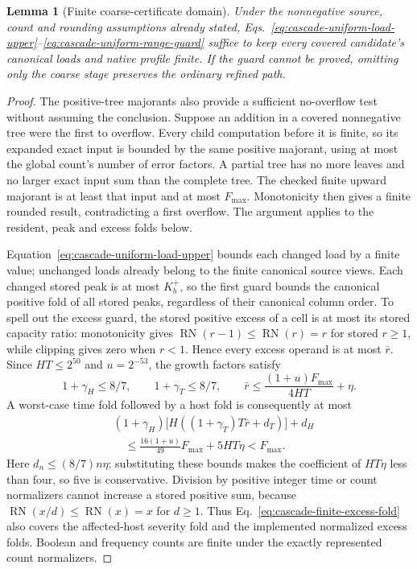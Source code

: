 \documentclass[11pt]{article}
\newtheorem{lemma}{Lemma}
\begin{document}
\begin{lemma}[Finite coarse-certificate domain]\label{lem:cascade-finite-domain}
Under the nonnegative source, count and rounding assumptions already stated, Eqs.~\eqref{eq:cascade-uniform-load-upper}--\eqref{eq:cascade-uniform-range-guard} suffice to keep every covered candidate's canonical loads and native profile finite. If the guard cannot be proved, omitting only the coarse stage preserves the ordinary refined path.
\end{lemma}
\begin{proof}
The positive-tree majorants also provide a sufficient no-overflow test without assuming the conclusion. Suppose an addition in a covered nonnegative tree were the first to overflow. Every child computation before it is finite, so its expanded exact input is bounded by the same positive majorant, using at most the global count's number of error factors. A partial tree has no more leaves and no larger exact input sum than the complete tree. The checked finite upward majorant is at least that input and at most $F_{\max}$. Monotonicity then gives a finite rounded result, contradicting a first overflow. The argument applies to the resident, peak and excess folds below.

Equation~\eqref{eq:cascade-uniform-load-upper} bounds each changed load by a finite value; unchanged loads already belong to the finite canonical source views. Each changed stored peak is at most $K_b^+$, so the first guard bounds the canonical positive fold of all stored peaks, regardless of their canonical column order. To spell out the excess guard, the stored positive excess of a cell is at most its stored capacity ratio: monotonicity gives $\operatorname{RN}(r-1)\le\operatorname{RN}(r)=r$ for stored $r\ge1$, while clipping gives zero when $r<1$. Hence every excess operand is at most $\bar r$. Since $HT\le2^{50}$ and $u=2^{-53}$, the growth factors satisfy
\begin{equation}
1+\gamma_H\le8/7,\qquad 1+\gamma_T\le8/7,
\qquad \bar r\le\frac{(1+u)F_{\max}}{4HT}+\eta.
\end{equation}
A worst-case time fold followed by a host fold is consequently at most
\begin{align}
&(1+\gamma_H)\bigl[H((1+\gamma_T)T\bar r+d_T)\bigr]+d_H\nonumber\\
&\quad\le\frac{16(1+u)}{49}F_{\max}+5HT\eta<F_{\max}.
\label{eq:cascade-finite-excess-fold}
\end{align}
Here $d_n\le(8/7)n\eta$; substituting these bounds makes the coefficient of $HT\eta$ less than four, so five is conservative. Division by positive integer time or count normalizers cannot increase a stored positive sum, because $\operatorname{RN}(x/d)\le\operatorname{RN}(x)=x$ for $d\ge1$. Thus Eq.~\eqref{eq:cascade-finite-excess-fold} also covers the affected-host severity fold and the implemented normalized excess folds. Boolean and frequency counts are finite under the exactly represented count normalizers.


\end{proof}
\end{document}
